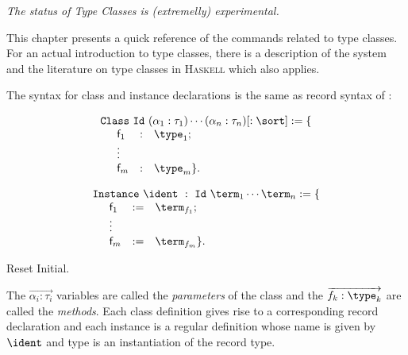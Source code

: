 \def\Haskell{\textsc{Haskell}\xspace}
\def\eol{\setlength\parskip{0pt}\par}
\def\indent#1{\noindent\kern#1}
\def\cst#1{\textsf{#1}}
\def\tele#1{\ensuremath{\overrightarrow{#1}}}

\label{typeclasses}

\begin{flushleft}
  \em The status of Type Classes is (extremelly) experimental.
\end{flushleft}

This chapter presents a quick reference of the commands related to type
classes. For an actual introduction to type classes, there is a
description of the system \cite{sozeau08} and the literature on type
classes in \Haskell which also applies.

\label{ClassesInstances}

The syntax for class and instance declarations is the same as
record syntax of \Coq:
\def\kw{\texttt}
\def\classid{\texttt}

\begin{center}
\[\begin{array}{l}
\kw{Class}~\classid{Id}~(\alpha_1 : \tau_1) \cdots (\alpha_n : \tau_n) 
[: \sort] := \{\\
\begin{array}{p{0em}lcl}
  & \cst{f}_1 & : & \type_1 ; \\
  & \vdots & &  \\
  & \cst{f}_m & : & \type_m \}.
\end{array}\end{array}\]
\end{center}
\begin{center}
\[\begin{array}{l}
\kw{Instance}~\ident~:~\classid{Id}~\term_1 \cdots \term_n := \{\\
\begin{array}{p{0em}lcl}
  & \cst{f}_1 & := & \term_{f_1} ; \\
  & \vdots & &  \\
  & \cst{f}_m & := & \term_{f_m} \}.
\end{array}\end{array}\]
\end{center}
\begin{coq_eval}
  Reset Initial.
\end{coq_eval}

The $\tele{\alpha_i : \tau_i}$ variables are called the \emph{parameters}
of the class and the $\tele{f_k : \type_k}$ are called the
\emph{methods}. Each class definition gives rise to a corresponding
record declaration and each instance is a regular definition whose name
is given by $\ident$ and type is an instantiation of the record type.

